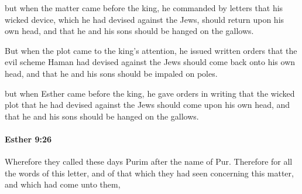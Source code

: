 			\begin{versebox}
					\item[BHS] 
					\item[LXX] 
					\item[ASV] but when the matter came before the king, he commanded by letters that his wicked device, which he had devised against the Jews, should return upon his own head, and that he and his sons should be hanged on the gallows.
					\item[NIV] But when the plot came to the king’s attention, he issued written orders that the evil scheme Haman had devised against the Jews should come back onto his own head, and that he and his sons should be impaled on poles.
					\item[NRSV] but when Esther came before the king, he gave orders in writing that the wicked plot that he had devised against the Jews should come upon his own head, and that he and his sons should be hanged on the gallows.
			\end{versebox}

		\paragraph{Esther 9:26} %
			\label{ESTHER-9-26}

			Wherefore they called these days Purim after the name of Pur. Therefore for all the words of this letter, and of that which they had seen concerning this matter, and which had come unto them,

